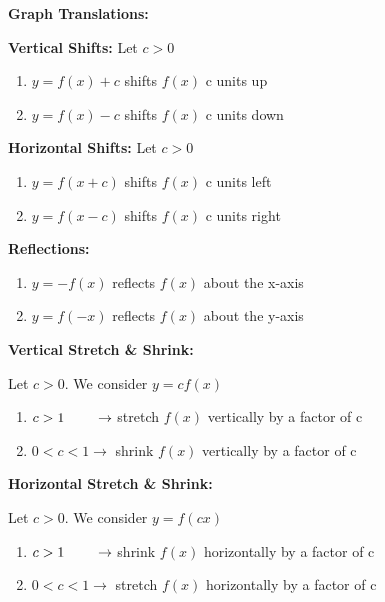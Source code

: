 \documentclass[12pt]{article}
\newenvironment{myindentpar}[1]%
     {\begin{list}{}%
             {\setlength{\leftmargin}{#1}}%
             \item[]%
     }
     {\end{list}}
\begin{document}
\vspace{1cm}

\textbf{Graph Translations:}

\begin{myindentpar}{2cm}

\textbf{Vertical Shifts:} Let $c>0$

\begin{enumerate}
\item $y=f(x) + c$ shifts $f(x)$ c units up
\item $y=f(x) - c$ shifts $f(x)$ c units down
\end{enumerate}

\textbf{Horizontal Shifts:} Let $c>0$

\begin{enumerate}
\item $y=f(x+c)$ shifts $f(x)$ c units left
\item $y=f(x-c)$ shifts $f(x)$ c units right
\end{enumerate}

\textbf{Reflections:} 

\begin{enumerate}
\item $y=-f(x)$ reflects $f(x)$ about the x-axis
\item $y=f(-x)$ reflects $f(x)$ about the y-axis
\end{enumerate}

\textbf{Vertical Stretch \& Shrink:} 
\newline

\centerline{Let $c>0$. We consider $y=cf(x)$}

\begin{enumerate}
\item $c>1 \hspace{.75cm} \to$ stretch $f(x)$ vertically by a factor of c
\item $0<c<1 \to$ shrink $f(x)$ vertically by a factor of c
\end{enumerate}
\vspace{.5cm}
\textbf{Horizontal Stretch \& Shrink:} 
\newline

\centerline{Let $c>0$. We consider $y=f(cx)$}

\begin{enumerate}
\item $c>1 \hspace{.75cm} \to$ shrink $f(x)$ horizontally by a factor of c
\item $0<c<1 \to$ stretch $f(x)$ horizontally by a factor of c
\end{enumerate}
\end{myindentpar}
\end{document}
